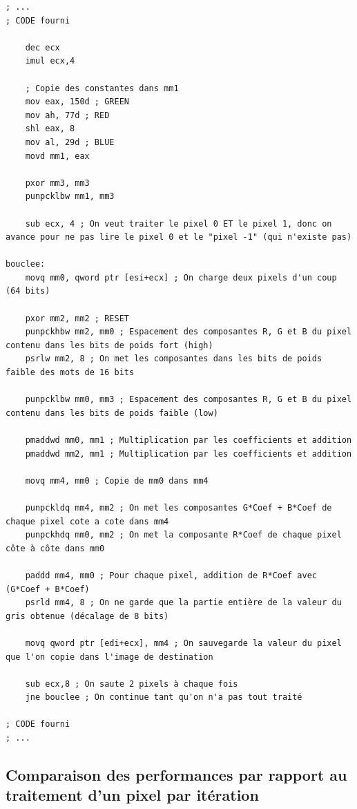 \begin{lstlisting}
; ...
; CODE fourni

    dec ecx
    imul ecx,4

    ; Copie des constantes dans mm1
    mov eax, 150d ; GREEN
    mov ah, 77d ; RED
    shl eax, 8
    mov al, 29d ; BLUE
    movd mm1, eax

    pxor mm3, mm3
    punpcklbw mm1, mm3

    sub ecx, 4 ; On veut traiter le pixel 0 ET le pixel 1, donc on avance pour ne pas lire le pixel 0 et le "pixel -1" (qui n'existe pas)

bouclee:
    movq mm0, qword ptr [esi+ecx] ; On charge deux pixels d'un coup (64 bits)

    pxor mm2, mm2 ; RESET
    punpckhbw mm2, mm0 ; Espacement des composantes R, G et B du pixel contenu dans les bits de poids fort (high)
    psrlw mm2, 8 ; On met les composantes dans les bits de poids faible des mots de 16 bits

    punpcklbw mm0, mm3 ; Espacement des composantes R, G et B du pixel contenu dans les bits de poids faible (low)

    pmaddwd mm0, mm1 ; Multiplication par les coefficients et addition
    pmaddwd mm2, mm1 ; Multiplication par les coefficients et addition

    movq mm4, mm0 ; Copie de mm0 dans mm4

    punpckldq mm4, mm2 ; On met les composantes G*Coef + B*Coef de chaque pixel cote a cote dans mm4
    punpckhdq mm0, mm2 ; On met la composante R*Coef de chaque pixel côte à côte dans mm0

    paddd mm4, mm0 ; Pour chaque pixel, addition de R*Coef avec (G*Coef + B*Coef)
    psrld mm4, 8 ; On ne garde que la partie entière de la valeur du gris obtenue (décalage de 8 bits)

    movq qword ptr [edi+ecx], mm4 ; On sauvegarde la valeur du pixel que l'on copie dans l'image de destination

    sub ecx,8 ; On saute 2 pixels à chaque fois
    jne bouclee ; On continue tant qu'on n'a pas tout traité

; CODE fourni
; ...
\end{lstlisting}

\subsection{Comparaison des performances par rapport au traitement d'un pixel par itération}

